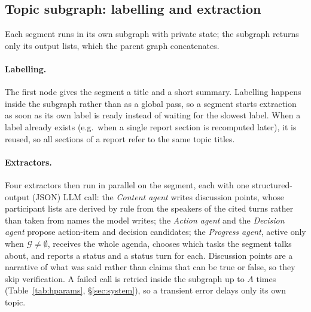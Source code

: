 \subsection{Topic subgraph: labelling and extraction}
\label{sec:method:extract}

Each segment runs in its own subgraph with private state; the subgraph returns only its output lists, which the parent graph concatenates.

\paragraph{Labelling.}
The first node gives the segment a title and a short summary.
Labelling happens inside the subgraph rather than as a global pass, so a segment starts extraction as soon as its own label is ready instead of waiting for the slowest label.
When a label already exists (e.g.\ when a single report section is recomputed later), it is reused, so all sections of a report refer to the same topic titles.

\paragraph{Extractors.}
Four extractors then run in parallel on the segment, each with one structured-output (JSON) LLM call:
the \emph{Content agent} writes discussion points, whose participant lists are derived by rule from the speakers of the cited turns rather than taken from names the model writes;
the \emph{Action agent} and the \emph{Decision agent} propose action-item and decision candidates;
the \emph{Progress agent}, active only when $\mathcal{G}\neq\emptyset$, receives the whole agenda, chooses which tasks the segment talks about, and reports a status and a status turn for each.
Discussion points are a narrative of what was said rather than claims that can be true or false, so they skip verification.
A failed call is retried inside the subgraph up to $A$ times (Table~\ref{tab:hparams}, \S\ref{sec:system}), so a transient error delays only its own topic.

